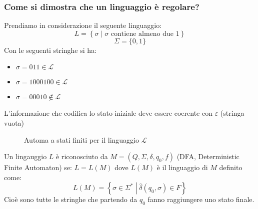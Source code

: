 \documentclass[a4paper]{article}
\begin{document}
\subsubsection{Come si dimostra che un linguaggio è regolare?}
\begin{example}
  Prendiamo in considerazione il seguente linguaggio:
  \[
    L = \left\{ \sigma  \;\left|\; \sigma \text{ contiene almeno due } 1 \right. \right\}
  \] 
  \[
    \Sigma = \{0,1\}
  \] 
  Con le seguenti stringhe si ha:
  \begin{itemize}
    \item \( \sigma = 011 \in \mathcal{L} \) 
    \item \( \sigma = 1000100 \in \mathcal{L} \) 
    \item \( \sigma = 00010 \notin \mathcal{L} \) 
  \end{itemize}
  L'informazione che codifica lo stato iniziale deve essere coerente con \( \varepsilon  \) 
  (stringa vuota)
  \begin{figure}[H]
    \centering
    \caption{Automa a stati finiti per il linguaggio \( \mathcal{L} \)}
  \end{figure}
\end{example}
Un lingauggio \( L \) è riconosciuto da \( M = \left( Q, \Sigma, \delta, q_0, f \right)  \) (DFA, Deterministic Finite Automaton) se:
\( L = L(M) \) dove \( L(M) \) è il linguaggio di \( M \) definito come:
\[
  L(M) = \left\{ \sigma  \in \Sigma^* \;\left|\; \hat{\delta}(q_0, \sigma) \in F \right. \right\}
\] 
Cioè sono tutte le stringhe che partendo da \( q_0 \) fanno raggiungere uno stato finale.
\end{document}
